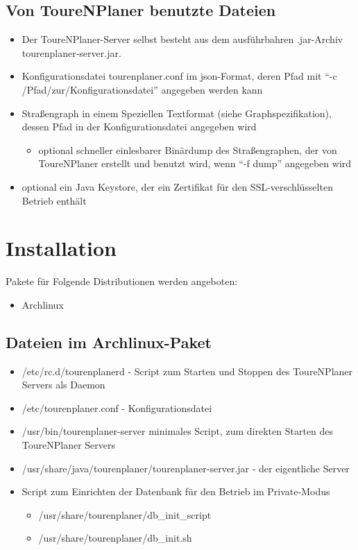 \documentclass[ngerman,titlepage,parskip=true]{scrartcl}
\begin{document}
  \subsection{Von ToureNPlaner benutzte Dateien}
	 \begin{itemize}
	   \item Der ToureNPlaner-Server selbst besteht aus dem ausf\"uhrbahren .jar-Archiv tourenplaner-server.jar.
	   \item Konfigurationsdatei tourenplaner.conf im json-Format, deren Pfad mit ``-c /Pfad/zur/Konfigurationsdatei'' angegeben werden kann
	   \item Stra\ss{}engraph in einem Speziellen Textformat (siehe Graphspezifikation), dessen Pfad in der Konfigurationsdatei angegeben wird
		\begin{itemize}
		  \item optional schneller einlesbarer Bin\"ardump des Stra\ss{}engraphen, der von ToureNPlaner erstellt und benutzt wird, wenn ``-f dump'' angegeben wird
		\end{itemize}
	   \item optional ein Java Keystore, der ein Zertifikat f\"ur den SSL-verschl\"usselten Betrieb enth\"alt
	 \end{itemize}

\section{Installation}
  Pakete f\"ur Folgende Distributionen werden angeboten:
  \begin{itemize}
    \item Archlinux
  \end{itemize}
  \subsection{Dateien im Archlinux-Paket}
	\begin{itemize}
	  \item /etc/rc.d/tourenplanerd - Script zum Starten und Stoppen des ToureNPlaner Servers als Daemon
	  \item /etc/tourenplaner.conf - Konfigurationsdatei
	  \item /usr/bin/tourenplaner-server minimales Script, zum direkten Starten des ToureNPlaner Servers
	  \item /usr/share/java/tourenplaner/tourenplaner-server.jar - der eigentliche Server
	  \item Script zum Einrichten der Datenbank f\"ur den Betrieb im Private-Modus
		\begin{itemize}
		  \item /usr/share/tourenplaner/db\_init\_script
		  \item /usr/share/tourenplaner/db\_init.sh
		\end{itemize}
	\end{itemize}
\end{document}
